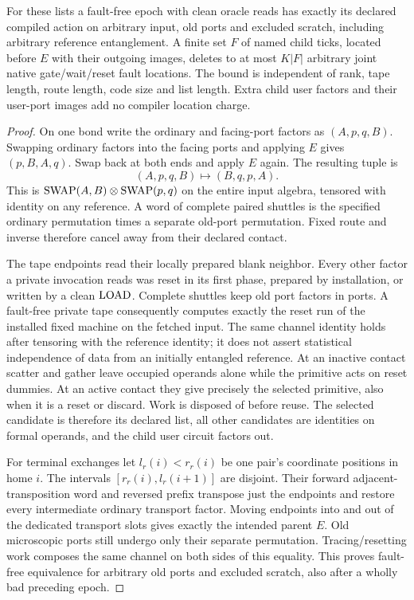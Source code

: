 \begin{lemma}\label{lem:deletion}
For these lists a fault-free epoch with clean oracle reads has exactly its declared compiled action on arbitrary input, old ports and excluded scratch, including arbitrary reference entanglement. A finite set $F$ of named child ticks, located before $E$ with their outgoing images, deletes to at most $K|F|$ arbitrary joint native gate/wait/reset fault locations. The bound is independent of rank, tape length, route length, code size and list length. Extra child user factors and their user-port images add no compiler location charge.
\end{lemma}
\begin{proof}
On one bond write the ordinary and facing-port factors as $(A,p,q,B)$. Swapping ordinary factors into the facing ports and applying $E$ gives $(p,B,A,q)$. Swap back at both ends and apply $E$ again. The resulting tuple is
\begin{equation}\label{eq:shuttle}
 (A,p,q,B)\longmapsto(B,q,p,A).
\end{equation}
This is $\operatorname{SWAP}(A,B)\otimes\operatorname{SWAP}(p,q)$ on the entire input algebra, tensored with identity on any reference. A word of complete paired shuttles is the specified ordinary permutation times a separate old-port permutation. Fixed route and inverse therefore cancel away from their declared contact.

The tape endpoints read their locally prepared blank neighbor. Every other factor a private invocation reads was reset in its first phase, prepared by installation, or written by a clean $\operatorname{LOAD}$. Complete shuttles keep old port factors in ports. A fault-free private tape consequently computes exactly the reset run of the installed fixed machine on the fetched input. The same channel identity holds after tensoring with the reference identity; it does not assert statistical independence of data from an initially entangled reference. At an inactive contact scatter and gather leave occupied operands alone while the primitive acts on reset dummies. At an active contact they give precisely the selected primitive, also when it is a reset or discard. Work is disposed of before reuse. The selected candidate is therefore its declared list, all other candidates are identities on formal operands, and the child user circuit factors out.

For terminal exchanges let $l_r(i)<r_r(i)$ be one pair's coordinate positions in home $i$. The intervals $[r_r(i),l_r(i+1)]$ are disjoint. Their forward adjacent-transposition word and reversed prefix transpose just the endpoints and restore every intermediate ordinary transport factor. Moving endpoints into and out of the dedicated transport slots gives exactly the intended parent $E$. Old microscopic ports still undergo only their separate permutation. Tracing/resetting work composes the same channel on both sides of this equality. This proves fault-free equivalence for arbitrary old ports and excluded scratch, also after a wholly bad preceding epoch.


\end{proof}
